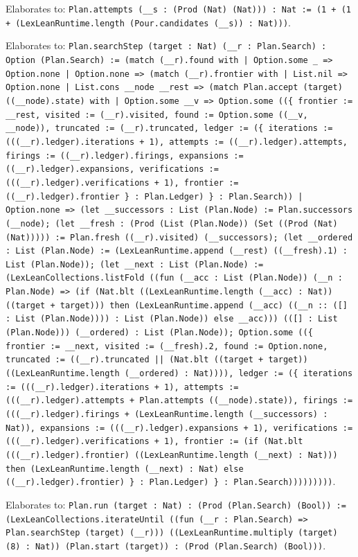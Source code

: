 \documentclass[11pt]{article}
\begin{document}
\noindent Elaborates to: \texttt{Plan.attempts (\_\_s : (Prod (Nat) (Nat))) : Nat := (1 + (1 + (LexLeanRuntime.length (Pour.candidates (\_\_s)) : Nat)))}.\par
\noindent Elaborates to: \texttt{Plan.searchStep (target : Nat) (\_\_r : Plan.Search) : Option (Plan.Search) := (match (\_\_r).found with | Option.some \_ => Option.none | Option.none => (match (\_\_r).frontier with | List.nil => Option.none | List.cons \_\_node \_\_rest => (match Plan.accept (target) ((\_\_node).state) with | Option.some \_\_v => Option.some ((\{ frontier := \_\_rest, visited := (\_\_r).visited, found := Option.some ((\_\_v, \_\_node)), truncated := (\_\_r).truncated, ledger := (\{ iterations := (((\_\_r).ledger).iterations + 1), attempts := ((\_\_r).ledger).attempts, firings := ((\_\_r).ledger).firings, expansions := ((\_\_r).ledger).expansions, verifications := (((\_\_r).ledger).verifications + 1), frontier := ((\_\_r).ledger).frontier \} : Plan.Ledger) \} : Plan.Search)) | Option.none => (let \_\_successors : List (Plan.Node) := Plan.successors (\_\_node); (let \_\_fresh : (Prod (List (Plan.Node)) (Set ((Prod (Nat) (Nat))))) := Plan.fresh ((\_\_r).visited) (\_\_successors); (let \_\_ordered : List (Plan.Node) := (LexLeanRuntime.append (\_\_rest) ((\_\_fresh).1) : List (Plan.Node)); (let \_\_next : List (Plan.Node) := (LexLeanCollections.listFold ((fun (\_\_acc : List (Plan.Node)) (\_\_n : Plan.Node) => (if (Nat.blt ((LexLeanRuntime.length (\_\_acc) : Nat)) ((target + target))) then (LexLeanRuntime.append (\_\_acc) ((\_\_n :: ([] : List (Plan.Node)))) : List (Plan.Node)) else \_\_acc))) (([] : List (Plan.Node))) (\_\_ordered) : List (Plan.Node)); Option.some ((\{ frontier := \_\_next, visited := (\_\_fresh).2, found := Option.none, truncated := ((\_\_r).truncated || (Nat.blt ((target + target)) ((LexLeanRuntime.length (\_\_ordered) : Nat)))), ledger := (\{ iterations := (((\_\_r).ledger).iterations + 1), attempts := (((\_\_r).ledger).attempts + Plan.attempts ((\_\_node).state)), firings := (((\_\_r).ledger).firings + (LexLeanRuntime.length (\_\_successors) : Nat)), expansions := (((\_\_r).ledger).expansions + 1), verifications := (((\_\_r).ledger).verifications + 1), frontier := (if (Nat.blt (((\_\_r).ledger).frontier) ((LexLeanRuntime.length (\_\_next) : Nat))) then (LexLeanRuntime.length (\_\_next) : Nat) else ((\_\_r).ledger).frontier) \} : Plan.Ledger) \} : Plan.Search)))))))))}.\par
\noindent Elaborates to: \texttt{Plan.run (target : Nat) : (Prod (Plan.Search) (Bool)) := (LexLeanCollections.iterateUntil ((fun (\_\_r : Plan.Search) => Plan.searchStep (target) (\_\_r))) ((LexLeanRuntime.multiply (target) (8) : Nat)) (Plan.start (target)) : (Prod (Plan.Search) (Bool)))}.\par
\end{document}
